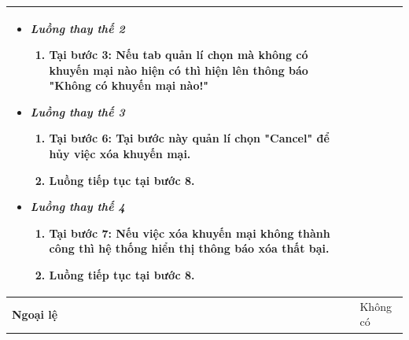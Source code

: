 \begin{center}
\begin{longtable}{ | l |p{10cm}|}
\begin{itemize}
			\item \textit{Luồng thay thế 2}
			\begin{enumerate}
				\item Tại bước 3: Nếu tab quản lí chọn mà không có khuyến mại nào hiện có thì hiện lên thông báo "Không có khuyến mại nào!"
			\end{enumerate}
			
			\item \textit{Luồng thay thế 3}
			\begin{enumerate}
				\item Tại bước 6: Tại bước này quản lí chọn "Cancel" để hủy việc xóa khuyến mại.
				\item Luồng tiếp tục tại bước 8. 
			\end{enumerate}
			
			\item \textit{Luồng thay thế 4}
			\begin{enumerate}
				\item Tại bước 7: Nếu việc xóa khuyến mại không thành công thì hệ thống hiển thị thông báo xóa thất bại.
				\item Luồng tiếp tục tại bước 8. 
			\end{enumerate}
		\end{itemize} \\ \hline 
		\textbf{Ngoại lệ}  & Không có \\
		\hline
	\end{longtable}
\end{center}
